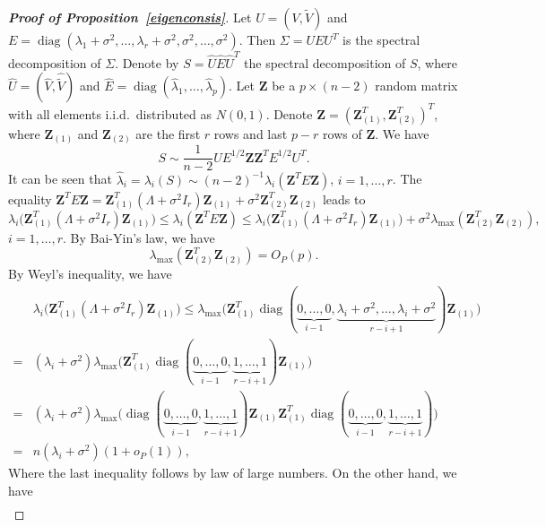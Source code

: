 \documentclass[review]{elsarticle}
\DeclareMathOperator{\mydiag}{diag}
\newcommand{\bZ}{\mathbf{Z}}
\theoremstyle{plain}
\theoremstyle{definition}
\theoremstyle{remark}
\begin{document}
\begin{proof}[\textbf{Proof of Proposition~\ref{eigenconsis}}]
    Let $U=(V,\tilde{V})$ and $E=\mydiag(\lambda_1+\sigma^2,\ldots,\lambda_r+\sigma^2,\sigma^2,\ldots,\sigma^2)$. Then $\Sigma=UEU^T$ is the spectral decomposition of $\Sigma$.
Denote by $S=\hat{U}\hat{E}\hat{U}^T$ the spectral decomposition of $S$, where $\hat{U}=(\hat{V},\hat{\tilde{V}})$ and $\hat{E}=\mydiag(\hat{\lambda}_1,\ldots,\hat{\lambda}_p)$.
Let $\bZ$ be a $p\times (n-2)$ random matrix with all elements i.i.d.\ distributed as $N(0,1)$.
Denote $\bZ={(\bZ_{(1)}^T,\bZ_{(2)}^T)}^T$, where $\bZ_{(1)}$ and $\bZ_{(2)}$ are the first $r$ rows and last $p-r$ rows of $\bZ$. 
We have
$$
S\sim \frac{1}{n-2} U E^{1/2} \bZ \bZ^T E^{1/2} U^T.
$$
It can be seen that $\hat{\lambda}_i=\lambda_i(S)\sim (n-2)^{-1}\lambda_i(\bZ^T E \bZ)$, $i=1,\ldots,r$.
The  equality
$
    \bZ^T E \bZ= \bZ_{(1)}^T (\Lambda +\sigma^2 I_r) \bZ_{(1)}+
\sigma^2 \bZ_{(2)}^T  \bZ_{(2)}
$
leads to
    \begin{equation}\label{aiai1}
    \lambda_i \big(\bZ_{(1)}^T(\Lambda+\sigma^2 I_r)\bZ_{(1)}\big)
\leq \lambda_i(\bZ^T E \bZ)
\leq
\lambda_i \big(\bZ_{(1)}^T(\Lambda+\sigma^2 I_r)\bZ_{(1)}\big)
+\sigma^2\lambda_{\max}(\bZ_{(2)}^T \bZ_{(2)}),
    \end{equation}
$i=1,\ldots, r$.
By Bai-Yin's law, we have
\begin{equation}\label{aiai2}
    \lambda_{\max}(\bZ_{(2)}^T \bZ_{(2)})=O_P(p).
\end{equation}
By Weyl's inequality, we have
$$
    \begin{aligned}
        &\lambda_i\big(\bZ_{(1)}^T(\Lambda+\sigma^2 I_r)\bZ_{(1)}\big)
        \leq
    \lambda_{\max}\big(\bZ_{(1)}^T \mydiag(\underbrace{0,\ldots,0}_{i-1},\underbrace{\lambda_i +\sigma^2,\ldots,\lambda_i+\sigma^2}_{r-i+1})\bZ_{(1)}\big)\\
        =&
        (\lambda_i+\sigma^2)\lambda_{\max}\big(\bZ_{(1)}^T\mydiag(\underbrace{0,\ldots,0}_{i-1},\underbrace{1,\ldots,1}_{r-i+1})\bZ_{(1)}\big)\\
        =&
        (\lambda_i+\sigma^2)\lambda_{\max}\big( \mydiag(\underbrace{0,\ldots,0}_{i-1},\underbrace{1,\ldots,1}_{r-i+1})\bZ_{(1)}\bZ_{(1)}^T \mydiag(\underbrace{0,\ldots,0}_{i-1},\underbrace{1,\ldots,1}_{r-i+1})\big)\\
        =&n(\lambda_i+\sigma^2)(1+o_P(1)),
    \end{aligned}
    $$
    Where the last inequality follows by law of large numbers.
    On the other hand, we have
$$
    \begin{aligned}

\end{aligned}$$
\end{proof}
\end{document}
